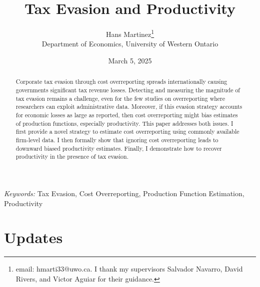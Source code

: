 \documentclass[
  12pt]{article}
\theoremstyle{definition}
\theoremstyle{remark}
\begin{document}
\def\spacingset#1{\renewcommand{\baselinestretch}%
{#1}\small\normalsize} \spacingset{1}



\date{March 5, 2025}
\title{\bf Tax Evasion and Productivity}
\author{
Hans Martinez\thanks{email: hmarti33@uwo.ca. I thank my supervisors
Salvador Navarro, David Rivers, and Victor Aguiar for their guidance.}\\
Department of Economics, University of Western Ontario\\
}
\maketitle

\bigskip
\bigskip
\begin{abstract}
Corporate tax evasion through cost overreporting spreads internationally
causing governments significant tax revenue losses. Detecting and
measuring the magnitude of tax evasion remains a challenge, even for the
few studies on overreporting where researchers can exploit
administrative data. Moreover, if this evasion strategy accounts for
economic losses as large as reported, then cost overreporting might bias
estimates of production functions, especially productivity. This paper
addresses both issues. I first provide a novel strategy to estimate cost
overreporting using commonly available firm-level data. I then formally
show that ignoring cost overreporting leads to downward biased
productivity estimates. Finally, I demonstrate how to recover
productivity in the presence of tax evasion.
\end{abstract}

\noindent%
{\it Keywords:} Tax Evasion, Cost Overreporting, Production Function
Estimation, Productivity
\vfill

\newpage
\spacingset{1.9} %

\section*{Updates}\label{updates}
\end{document}

